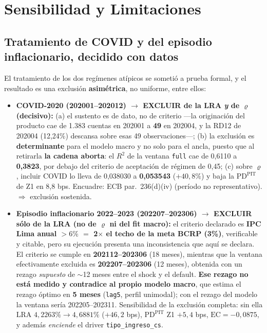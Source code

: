 \documentclass[12pt, a4paper]{article}
\newcommand{\PDPIT}{\ensuremath{\mathrm{PD}^{\mathrm{PIT}}}}
\renewcommand{\rho}{\ensuremath{\varrho}}
\newcommand{\EC}{\ensuremath{\mathrm{EC}}}
\begin{document}
\newpage

\section{Sensibilidad y Limitaciones}
\label{sec:sens}

\subsection{Tratamiento de COVID y del episodio inflacionario, decidido con datos}
\label{sec:exclusiones}
El tratamiento de los dos regímenes atípicos se sometió a prueba formal, y el resultado es una
exclusión \textbf{asimétrica}, no uniforme, entre ellos:
\begin{itemize}[nosep]
  \item \textbf{COVID-2020 (202001--202012) $\to$ EXCLUIR de la LRA \emph{y} de $\rho$ (decisivo):}
    (a) el sustento es de dato, no de criterio ---la originación del producto cae de 1.383 cuentas
    en 202001 a \textbf{49} en 202004, y la RD12 de 202004 (12,24\%) descansa sobre esas 49
    observaciones---; (b) la exclusión es \textbf{determinante} para el modelo macro y no solo para el
    ancla, puesto que al retirarla \textbf{la cadena aborta}: el $R^2$ de la ventana \texttt{full}
    cae de 0,6110 a \textbf{0,3823}, por debajo del criterio de aceptación de régimen de 0,45;
    (c) sobre $\rho$, incluir COVID lo lleva de 0,038030 a \textbf{0,053543} ($+40{,}8\%$) y baja
    la $\PDPIT$ de Z1 en 8,8 bps.
    Encuadre: ECB par.~236(d)(iv) (período no representativo). $\Rightarrow$ exclusión sostenida.
  \item \textbf{Episodio inflacionario 2022--2023 (202207--202306) $\to$ EXCLUIR sólo de la LRA (no
    de $\rho$ ni del fit macro):} el criterio declarado es \textbf{IPC Lima anual $>6\%$ $=$
    2$\times$ el techo de la meta BCRP (3\%)}, verificable y citable, pero su ejecución presenta una
    inconsistencia que aquí se declara. El criterio se cumple en \textbf{202112--202306} (18 meses),
    mientras que la ventana efectivamente excluida es \textbf{202207--202306} (12 meses), obtenida
    con un rezago \emph{supuesto} de $\sim$12 meses entre el shock y el default. \textbf{Ese rezago no está medido y contradice al propio modelo macro}, que
    estima el rezago óptimo en \textbf{5 meses} (\texttt{lag5}, perfil unimodal); con el rezago del
    modelo la ventana sería 202205--202311. Sensibilidad de la exclusión completa: sin ella
    LRA $4{,}2263\%\to4{,}6881\%$ ($+46{,}2$ bps), $\PDPIT$ Z1 $+5{,}4$ bps, $\EC=-0{,}0875$, y
    además \emph{enciende} el driver \texttt{tipo\_ingreso\_cs}.
\end{itemize}
\end{document}
